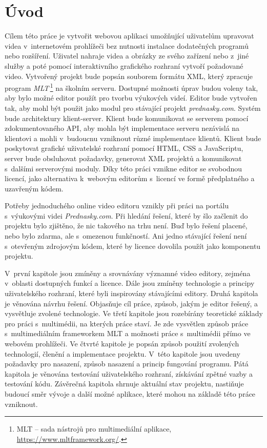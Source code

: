 \chapter{Úvod}
Cílem této práce je vytvořit webovou aplikaci umožňující uživatelům upravovat videa v~internetovém prohlížeči bez nutnosti instalace dodatečných programů nebo rozšíření. Uživatel nahraje videa a obrázky ze svého zařízení nebo z~jiné služby a poté pomocí interaktivního grafického rozhraní vytvoří požadované video. Vytvořený projekt bude popsán souborem formátu XML, který zpracuje program \textit{MLT}\,\footnote{MLT -- sada nástrojů pro multimediální aplikace, \url{https://www.mltframework.org/}.} na školním serveru. Dostupné možnosti úprav budou voleny tak, aby bylo možné editor použít pro tvorbu výukových videí. Editor bude vytvořen tak, aby mohl být použit jako modul pro stávající projekt \textit{prednasky.com}.
Systém bude architektury klient-server. Klient bude komunikovat se serverem pomocí zdokumentovaného API, aby mohla být implementace serveru nezávislá na klientovi a mohli v~budoucnu vzniknout různé implementace klientů. Klient bude poskytovat grafické uživatelské rozhraní pomocí HTML, CSS a JavaScriptu, server bude obsluhovat požadavky, generovat XML projektů a komunikovat s~dalšími serverovými moduly. Díky této práci vznikne editor se svobodnou licencí, jako alternativa k~webovým editorům s~licencí ve formě předplatného a uzavřeným kódem.

Potřeby jednoduchého online video editoru vznikly při práci na portálu s~výukovými videi \textit{Prednasky.com}. Při hledání řešení, které by šlo začlenit do projektu bylo zjištěno, že nic takového na trhu není. Buď bylo řešení placené, nebo bylo zdarma, ale s~omezenou funkčností. Ani jedno stávající řešení není s~otevřeným zdrojovým kódem, které by licence dovolila použít jako komponentu projektu.

V~první kapitole jsou zmíněny a srovnávány významné video editory, zejména v~oblasti dostupných funkcí a licence. Dále jsou zmíněny technologie a principy uživatelského rozhraní, které byli inspirovány stávajícími editory. Druhá kapitola je věnována návrhu řešení. Objasňuje cíl práce, způsob, jakým je editor řešený, a vysvětluje zvolené technologie. Ve třetí kapitole jsou rozebírány teoretické základy pro práci s~multimédii, na kterých práce staví. Je zde vysvětlen způsob práce s~multimediálním frameworkem MLT a možnosti práce s~multimédii přímo ve webovém prohlížeči. Ve čtvrté kapitole je popsán způsob použití zvolených technologií, členění a implementace projektu. V~této kapitole jsou uvedeny požadavky pro nasazení, způsob nasazení a princip fungování programu. Pátá kapitola je věnována testování uživatelského rozhraní, získávání zpětné vazby a testování kódu. Závěrečná kapitola shrnuje aktuální stav projektu, nastiňuje budoucí směr vývoje a další možné aplikace, které mohou na základě této práce vzniknout.

